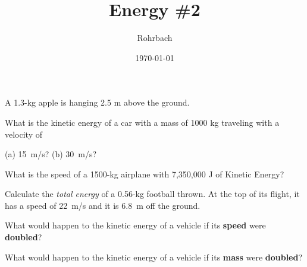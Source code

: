 \documentclass[10pt]{exam}
\title{Energy \#2}
\author{Rohrbach}
\date{\today}
\begin{document}
\maketitle

\begin{questions}

\question
  A 1.3-kg apple is hanging 2.5 m above the ground.


\question
  What is the kinetic energy of a car with a mass of 1000 kg traveling with a velocity of 
  
  (a) 15~m/s? \hfill (b) 30~m/s? \hfill
  \vs

\question
  What is the speed of a 1500-kg airplane with 7,350,000 J of Kinetic Energy?
  \vs

\question
  Calculate the \emph{total energy} of a 0.56-kg football thrown.  At the top of its flight, it has a speed of 22~m/s and it is 6.8~m off the ground.
  \vs

\pagebreak


\question 
  What would happen to the kinetic energy of a vehicle if its {\bf speed} were {\bf doubled}?
  \vs 

\question 
  What would happen to the kinetic energy of a vehicle if its {\bf mass} were {\bf doubled}?
  \vs 


\end{questions}
\end{document}
